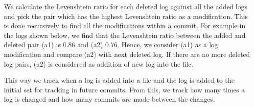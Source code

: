 We calculate the Levenshtein ratio for each deleted log against all the added logs and pick the pair which has the highest Levenshtein ratio  as a modification. This is done recursively to find all the modifications within a commit. For example in the logs shown below, we find that the Levenshtein ratio between the added and deleted pair (a1) is 0.86 and (a2) 0.76. Hence, we consider (a1) as a log modification and compare (a2) with next deleted log. If there are no more deleted log pairs, (a2) is considered as addition of new log into the file. 

This way we track when a log is added into a file and the log is added to the initial set for tracking in future commits. From this, we track how many times a log is changed and how many commits are made between the changes. 







